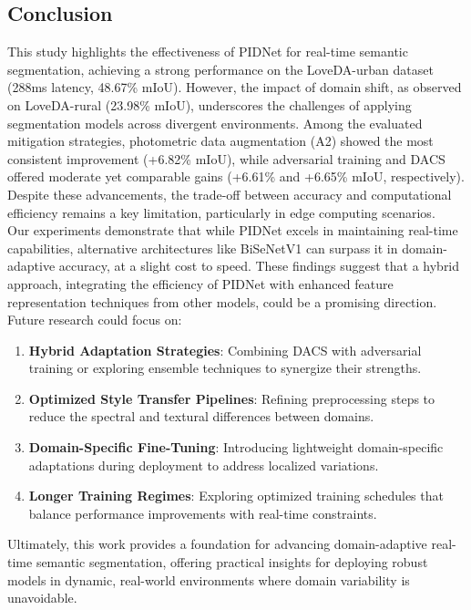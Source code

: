\documentclass{article}
\begin{document}
\begin{multicols}{2}
		\section{Conclusion}
		\justifying


		This study highlights the effectiveness of PIDNet for real-time semantic segmentation, achieving a strong performance on the LoveDA-urban dataset (288ms latency, 48.67\% mIoU). However, the impact of domain shift, as observed on LoveDA-rural (23.98\% mIoU), underscores the challenges of applying segmentation models across divergent environments. Among the evaluated mitigation strategies, photometric data augmentation (A2) showed the most consistent improvement (+6.82\% mIoU), while adversarial training and DACS offered moderate yet comparable gains (+6.61\% and +6.65\% mIoU, respectively). Despite these advancements, the trade-off between accuracy and computational efficiency remains a key limitation, particularly in edge computing scenarios. 
		\\
		Our experiments demonstrate that while PIDNet excels in maintaining real-time capabilities, alternative architectures like BiSeNetV1 can surpass it in domain-adaptive accuracy, at a slight cost to speed. These findings suggest that a hybrid approach, integrating the efficiency of PIDNet with enhanced feature representation techniques from other models, could be a promising direction.
		Future research could focus on:

		\begin{enumerate}
			\item \textbf {Hybrid Adaptation Strategies}: Combining DACS with adversarial training or exploring ensemble techniques to synergize their strengths.
			\item \textbf {Optimized Style Transfer Pipelines}: Refining preprocessing steps to reduce the spectral and textural differences between domains.
			\item \textbf {Domain-Specific Fine-Tuning}: Introducing lightweight domain-specific adaptations during deployment to address localized variations.
			\item \textbf {Longer Training Regimes}: Exploring optimized training schedules that balance performance improvements with real-time constraints.
		\end{enumerate}
		
		Ultimately, this work provides a foundation for advancing domain-adaptive real-time semantic segmentation, offering practical insights for deploying robust models in dynamic, real-world environments where domain variability is unavoidable.
		

		
	\end{multicols}
	
	
	
	
\end{document}
